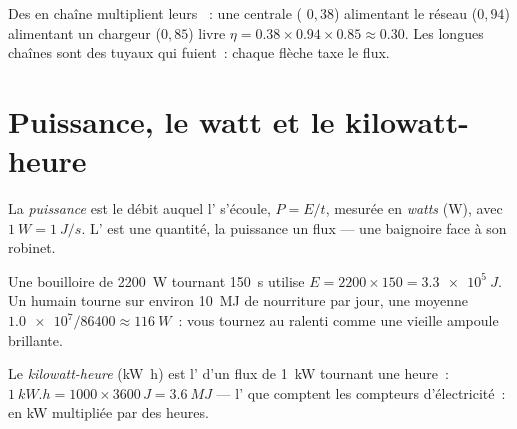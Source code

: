 \begin{remark}\label{rem:g10:energy-conservation:chain-eta}
Des  en chaîne multiplient leurs
~: une centrale ( $0{,}38$) alimentant
le réseau ($0{,}94$) alimentant un chargeur ($0{,}85$) livre
$\eta = 0.38 \times 0.94 \times 0.85 \approx 0.30$. Les longues chaînes
sont des tuyaux qui fuient~: chaque flèche taxe le flux.
\end{remark}

\section{Puissance, le watt et le kilowatt-heure}

\begin{definition}[Puissance]\label{def:g10:energy-conservation:power}
La \emph{puissance} est le débit auquel
l' s'écoule, $P = E/t$, mesurée en
\emph{watts} (\unit{W}), avec
$\qty{1}{W} = \qty{1}{J/s}$. L' est une
quantité, la puissance un flux --- une baignoire face à son robinet.
\end{definition}

\begin{example}\label{ex:g10:energy-conservation:power}
Une bouilloire de \qty{2200}{W} tournant \qty{150}{s} utilise
$E = 2200 \times 150 = \qty{3.3e5}{J}$. Un humain tourne sur environ
\qty{10}{MJ} de nourriture par jour, une moyenne
$\num{1.0e7}/\num{86400} \approx \qty{116}{W}$~: vous tournez au
ralenti comme une vieille ampoule brillante.
\end{example}

\begin{definition}\label{def:g10:energy-conservation:kwh}
Le \emph{kilowatt-heure} (\unit{kW.h}) est
l' d'un flux de \qty{1}{kW} tournant une heure~:
$\qty{1}{kW.h} = 1000 \times 3600\,\unit{J} = \qty{3.6}{MJ}$ ---
l' que comptent les compteurs d'électricité~:
 en \unit{kW} multipliée par des heures.
\end{definition}

